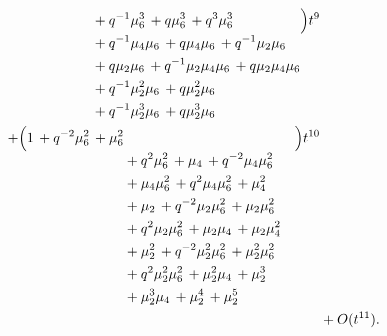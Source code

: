 \documentclass[10pt]{article}
\begin{document}
\[\begin{aligned}
\begin{aligned}[t]
  &{}+q^{-1}\mu_{6}^{3}\,+q\mu_{6}^{3}\,+q^{3}\mu_{6}^{3} \\
  &{}+q^{-1}\mu_{4}\mu_{6}\,+q\mu_{4}\mu_{6}\,+q^{-1}\mu_{2}\mu_{6} \\
  &{}+q\mu_{2}\mu_{6}\,+q^{-1}\mu_{2}\mu_{4}\mu_{6}\,+q\mu_{2}\mu_{4}\mu_{6} \\
  &{}+q^{-1}\mu_{2}^{2}\mu_{6}\,+q\mu_{2}^{2}\mu_{6} \\
  &{}+q^{-1}\mu_{2}^{3}\mu_{6}\,+q\mu_{2}^{3}\mu_{6}\end{aligned}\Bigr)t^{9} \\
  + \Bigl(\begin{aligned}[t]1\,+q^{-2}\mu_{6}^{2}\,+\mu_{6}^{2} \\
  &{}+q^{2}\mu_{6}^{2}\,+\mu_{4}\,+q^{-2}\mu_{4}\mu_{6}^{2} \\
  &{}+\mu_{4}\mu_{6}^{2}\,+q^{2}\mu_{4}\mu_{6}^{2}\,+\mu_{4}^{2} \\
  &{}+\mu_{2}\,+q^{-2}\mu_{2}\mu_{6}^{2}\,+\mu_{2}\mu_{6}^{2} \\
  &{}+q^{2}\mu_{2}\mu_{6}^{2}\,+\mu_{2}\mu_{4}\,+\mu_{2}\mu_{4}^{2} \\
  &{}+\mu_{2}^{2}\,+q^{-2}\mu_{2}^{2}\mu_{6}^{2}\,+\mu_{2}^{2}\mu_{6}^{2} \\
  &{}+q^{2}\mu_{2}^{2}\mu_{6}^{2}\,+\mu_{2}^{2}\mu_{4}\,+\mu_{2}^{3} \\
  &{}+\mu_{2}^{3}\mu_{4}\,+\mu_{2}^{4}\,+\mu_{2}^{5}\end{aligned}\Bigr)t^{10} \\
  &+ O(t^{11}).
\end{aligned}
\]
\end{document}
